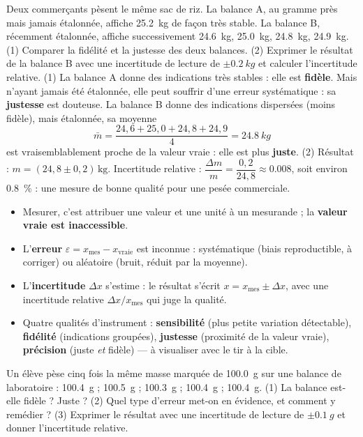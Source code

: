\documentclass[11pt]{article}
\begin{document}
\begin{exoresolu}
Deux commerçants pèsent le même sac de riz. La balance A, au gramme près mais jamais étalonnée, affiche \SI{25,2}{kg} de façon très stable. La balance B, récemment étalonnée, affiche successivement \SI{24,6}{kg}, \SI{25,0}{kg}, \SI{24,8}{kg}, \SI{24,9}{kg}. (1) Comparer la fidélité et la justesse des deux balances. (2) Exprimer le résultat de la balance B avec une incertitude de lecture de $\pm \SI{0,2}{kg}$ et calculer l'incertitude relative.
\tcblower
(1) La balance A donne des indications très stables : elle est \textbf{fidèle}. Mais n'ayant jamais été étalonnée, elle peut souffrir d'une erreur systématique : sa \textbf{justesse} est douteuse. La balance B donne des indications dispersées (moins fidèle), mais étalonnée, sa moyenne
\[
\bar{m} = \frac{24,6 + 25,0 + 24,8 + 24,9}{4} = \SI{24,8}{kg}
\]
est vraisemblablement proche de la valeur vraie : elle est plus \textbf{juste}. (2) Résultat : $m = (24,8 \pm 0,2)\,\text{kg}$. Incertitude relative : $\dfrac{\Delta m}{m} = \dfrac{0,2}{24,8} \approx \num{0,008}$, soit environ \SI{0,8}{\%} : une mesure de bonne qualité pour une pesée commerciale.
\end{exoresolu}

\begin{aretenir}
\begin{itemize}
\item Mesurer, c'est attribuer une valeur et une unité à un mesurande ; la \textbf{valeur vraie est inaccessible}.
\item L'\textbf{erreur} $\varepsilon = x_{\text{mes}} - x_{\text{vraie}}$ est inconnue : systématique (biais reproductible, à corriger) ou aléatoire (bruit, réduit par la moyenne).
\item L'\textbf{incertitude} $\Delta x$ s'estime : le résultat s'écrit $x = x_{\text{mes}} \pm \Delta x$, avec une incertitude relative $\Delta x / x_{\text{mes}}$ qui juge la qualité.
\item Quatre qualités d'instrument : \textbf{sensibilité} (plus petite variation détectable), \textbf{fidélité} (indications groupées), \textbf{justesse} (proximité de la valeur vraie), \textbf{précision} (juste \emph{et} fidèle) — à visualiser avec le tir à la cible.
\end{itemize}
\end{aretenir}

\begin{exercice}
Un élève pèse cinq fois la même masse marquée de \SI{100,0}{g} sur une balance de laboratoire : \SI{100,4}{g} ; \SI{100,5}{g} ; \SI{100,3}{g} ; \SI{100,4}{g} ; \SI{100,4}{g}. (1) La balance est-elle fidèle ? Juste ? (2) Quel type d'erreur met-on en évidence, et comment y remédier ? (3) Exprimer le résultat avec une incertitude de lecture de $\pm \SI{0,1}{g}$ et donner l'incertitude relative.
\end{exercice}
\end{document}

